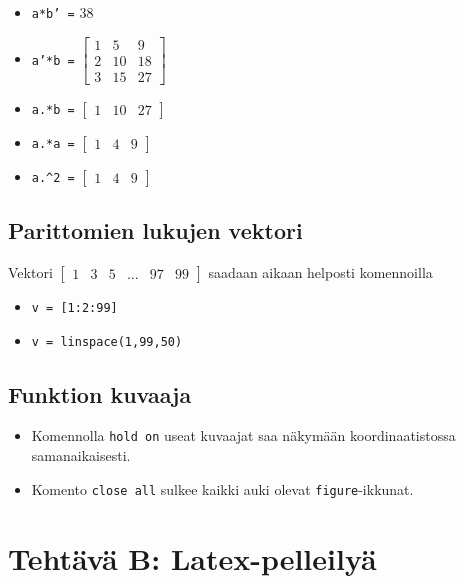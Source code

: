 \documentclass[a4paper,11pt]{article}
\begin{document}
{\begin{itemize}
	\item \texttt{a*b' =} $38$
	\item \texttt{a'*b =}
		$\begin{bmatrix}
		1 & 5 & 9\\
		2 & 10 & 18\\
		3 & 15 & 27
		\end{bmatrix}$
	\item \texttt{a.*b =}
		$\begin{bmatrix}
		1 & 10 & 27
		\end{bmatrix}$
	\item \texttt{a.*a =}
		$\begin{bmatrix}
		1 & 4 & 9
		\end{bmatrix}$
	\item \texttt{a.\^{}2 =}
		$\begin{bmatrix}
		1 & 4 & 9
		\end{bmatrix}$
\end{itemize}

\subsection{Parittomien lukujen vektori}

Vektori 
$\begin{bmatrix}
	1 & 3 & 5 & ... & 97 & 99
\end{bmatrix}$
saadaan aikaan helposti komennoilla

\begin{itemize}
	\item \texttt{v = [1:2:99]}
	\item \texttt{v = linspace(1,99,50)}
\end{itemize}

\subsection{Funktion kuvaaja}

\begin{itemize}
	\item Komennolla \texttt{hold on} useat kuvaajat saa näkymään koordinaatistossa samanaikaisesti.
	\item Komento \texttt{close all} sulkee kaikki auki olevat \texttt{figure}-ikkunat.
\end{itemize}

\clearpage

\section{Tehtävä B: Latex-pelleilyä}
}
\end{document}
